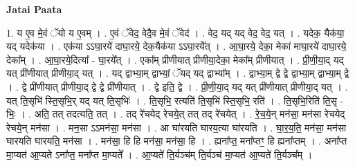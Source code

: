 \documentclass[17pt]{extarticle}
\begin{document}
\textbf{Jatai Paata} \newline

1. य ए॒व मे॒वं ॅयो य ए॒वम् । . ए॒वं ॅवेद॒ वेदै॒व मे॒वं ॅवेद॑ । . वेद॒ यद् यद् वेद॒ वेद॒ यत् । . यदेक॒ यैक॑या॒ यद् यदेक॑या । . एक॑या ऽऽघा॒रये॑ दाघा॒रये॒ देक॒यैक॑या ऽऽघा॒रये᳚त् । . आ॒घा॒रये॒ देका॒ मेका॑ माघा॒रये॑ दाघा॒रये॒ देका᳚म् । . आ॒घा॒रये॒दित्या᳚ - घा॒रये᳚त् । . एका᳚म् प्रीणीयात् प्रीणीया॒देका॒ मेका᳚म् प्रीणीयात् । . प्री॒णी॒या॒द् यद् यत् प्री॑णीयात् प्रीणीया॒द् यत् । . यद् द्वाभ्या॒म् द्वाभ्यां॒ ॅयद् यद् द्वाभ्या᳚म् । . द्वाभ्या॒म् द्वे द्वे द्वाभ्या॒म् द्वाभ्या॒म् द्वे । . द्वे प्री॑णीयात् प्रीणीया॒द् द्वे द्वे प्री॑णीयात् । . द्वे इति॒ द्वे । . प्री॒णी॒या॒द् यद् यत् प्री॑णीयात् प्रीणीया॒द् यत् । . यत् ति॒सृभि॑ स्ति॒सृभि॒र् यद् यत् ति॒सृभिः॑ । . ति॒सृभि॒ रत्यति॑ ति॒सृभि॑ स्ति॒सृभि॒ रति॑ । . ति॒सृभि॒रिति॑ ति॒सृ - भिः॒ । . अति॒ तत् तदत्यति॒ तत् । . तद् रे॑चयेद् रेचये॒त् तत् तद् रे॑चयेत् । . रे॒च॒ये॒न् मन॑सा॒ मन॑सा रेचयेद् रेचये॒न् मन॑सा । . मन॒सा ऽऽमन॑सा॒ मन॑सा । . आ घा॑रयति घारय॒त्या घा॑रयति । . घा॒र॒य॒ति॒ मन॑सा॒ मन॑सा घारयति घारयति॒ मन॑सा । . मन॑सा॒ हि हि मन॑सा॒ मन॑सा॒ हि । . ह्यना᳚प्त॒ मना᳚प्तꣳ॒॒ हि ह्यना᳚प्तम् । . अना᳚प्त मा॒प्यत॑ आ॒प्यते ऽना᳚प्त॒ मना᳚प्त मा॒प्यते᳚ । . आ॒प्यते॑ ति॒र्यञ्च॑म् ति॒र्यञ्च॑ मा॒प्यत॑ आ॒प्यते॑ ति॒र्यञ्च᳚म् । \newline
\end{document}
